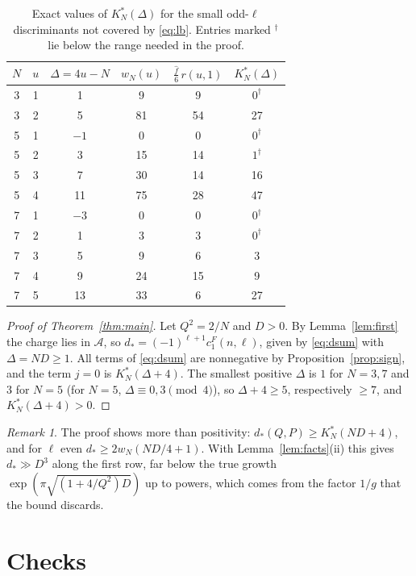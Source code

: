 \documentclass[11pt]{amsart}
\numberwithin{equation}{section}
\theoremstyle{plain}
\theoremstyle{remark}
\newtheorem{rem}[thm]{Remark}
\newcommand{\cA}{\mathcal{A}}
\begin{document}
\begin{table}[t]
\caption{Exact values of $K^*_N(\Delta)$ for the small odd-$\ell$ discriminants not covered by \eqref{eq:lb}. Entries marked $^\dagger$ lie below the range needed in the proof.}
\label{tab:small}
\centering
\begin{tabular}{cccccc}
\toprule
$N$ & $u$ & $\Delta=4u-N$ & $w_N(u)$ & $\frac{\hat f}6\,r(u,1)$ & $K^*_N(\Delta)$\\
\midrule
3 & 1 & 1 & 9 & 9 & $0^\dagger$\\
3 & 2 & 5 & 81 & 54 & 27\\
5 & 1 & $-1$ & 0 & 0 & $0^\dagger$\\
5 & 2 & 3 & 15 & 14 & $1^\dagger$\\
5 & 3 & 7 & 30 & 14 & 16\\
5 & 4 & 11 & 75 & 28 & 47\\
7 & 1 & $-3$ & 0 & 0 & $0^\dagger$\\
7 & 2 & 1 & 3 & 3 & $0^\dagger$\\
7 & 3 & 5 & 9 & 6 & 3\\
7 & 4 & 9 & 24 & 15 & 9\\
7 & 5 & 13 & 33 & 6 & 27\\
\bottomrule
\end{tabular}
\end{table}

\begin{proof}[Proof of Theorem~\ref{thm:main}]
Let $Q^2=2/N$ and $D>0$. By Lemma~\ref{lem:first} the charge lies in $\cA$, so $d_*=(-1)^{\ell+1}c^F_1(n,\ell)$, given by \eqref{eq:dsum} with $\Delta=ND\ge1$. All terms of \eqref{eq:dsum} are nonnegative by Proposition~\ref{prop:sign}, and the term $j=0$ is $K^*_N(\Delta+4)$. The smallest positive $\Delta$ is $1$ for $N=3,7$ and $3$ for $N=5$ (for $N=5$, $\Delta\equiv0,3\pmod4$), so $\Delta+4\ge5$, respectively $\ge7$, and $K^*_N(\Delta+4)>0$.
\end{proof}

\begin{rem}
The proof shows more than positivity: $d_*(Q,P)\ge K^*_N(ND+4)$, and for $\ell$ even $d_*\ge2w_N(ND/4+1)$. With Lemma~\ref{lem:facts}(ii) this gives $d_*\gg D^3$ along the first row, far below the true growth $\exp(\pi\sqrt{(1+4/Q^2)D})$ up to powers, which comes from the factor $1/g$ that the bound discards.
\end{rem}

\section{Checks}\label{sec:checks}
\end{document}
